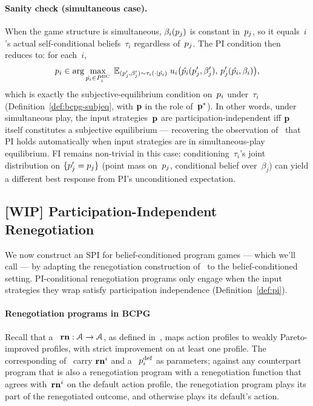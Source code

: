 \documentclass[sigconf]{aamas}
\theoremstyle{definition}
\newcommand{\bcprogspacei}{P^{\mathrm{BC}}_i}
\begin{document}
\paragraph{Sanity check (simultaneous case).}
When the game structure is simultaneous, $\beta_i(p_j)$ is constant in~$p_j$, so it equals~$i$'s actual self-conditional beliefs~$\tau_i$ regardless of~$p_j$. The PI condition then reduces to: for each~$i$,
$$
\progi \in \arg\max_{\hat{\progi} \in \bcprogspacei} \; \mathbb{E}_{(\progj', \beta_j') \sim \tau_i(\cdot \mid \hat{\progi})} \; \payi\bigl(\hat{\progi}(\progj', \beta_j'),\, \progj'(\hat{\progi}, \beta_i)\bigr),
$$
which is exactly the subjective-equilibrium condition on~$p_i$ under~$\tau_i$ (Definition~\ref{def:bcpg-subjeq}, with $\textbf{p}$ in the role of~$\textbf{p}^*$). In other words, under simultaneous play, the input strategies~$\textbf{p}$ are participation-independent iff $\textbf{p}$ itself constitutes a subjective equilibrium ---
recovering the observation of~\citet{digiovanni2024safe} that PI holds automatically when input strategies are in simultaneous-play equilibrium.
FI remains non-trivial in this case: conditioning~$\tau_i$'s joint distribution on $\{p_j' = p_j\}$ (point mass on~$p_j$, conditional belief over~$\beta_j$) can yield a different best response from PI's unconditioned expectation.


\subsection{[WIP] Participation-Independent Renegotiation}\label{sub:pireneg}

We now construct an SPI for belief-conditioned program games --- which we'll call  --- by adapting the renegotiation construction of~\citet[Sec.~3.2]{digiovanni2024safe} to the belief-conditioned setting. PI-conditional renegotiation programs only engage when the input strategies they wrap satisfy participation independence (Definition~\ref{def:pi}).

\paragraph{Renegotiation programs in BCPG}
Recall that a ~$\mathbf{rn} : \mathcal{A} \to \mathcal{A}$, as defined in~\citet[Sec.~3.2]{digiovanni2024safe}, maps action profiles to weakly Pareto-improved profiles, with strict improvement on at least one profile. The corresponding  of~\citet[Algorithm~1]{digiovanni2024safe} carry $\mathbf{rn}^i$ and a ~$p_i^{\textnormal{def}}$ as parameters; against any counterpart program that is also a renegotiation program with a renegotiation function that agrees with~$\mathbf{rn}^i$ on the default action profile, the renegotiation program plays its part of the renegotiated outcome, and otherwise plays its default's action.
\end{document}
